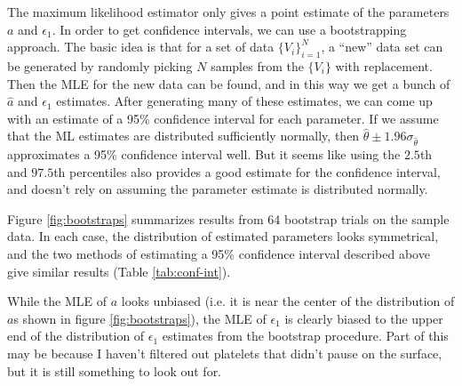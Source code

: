 The maximum likelihood estimator only gives a point estimate of the
parameters $a$ and $\epsilon_1$. In order to get confidence intervals,
we can use a bootstrapping approach. The basic idea is that for a set
of data $\{V_i\}_{i=1}^N$, a ``new'' data set can be generated by
randomly picking $N$ samples from the $\{V_i\}$ with replacement. Then
the MLE for the new data can be found, and in this way we get a bunch
of $\hat{a}$ and $\hat{\epsilon_1}$ estimates. After generating many of
these estimates, we can come up with an estimate of a 95\% confidence
interval for each parameter. If we assume that the ML estimates are
distributed sufficiently normally, then
$\hat{\theta} \pm 1.96 \sigma_{\hat{\theta}}$ approximates a 95\%
confidence interval well. But it seems like using the $2.5$th and
$97.5$th percentiles also provides a good estimate for the confidence
interval, and doesn't rely on assuming the parameter estimate is
distributed normally.

Figure \ref{fig:bootstraps} summarizes results from 64 bootstrap
trials on the sample data. In each case, the distribution of estimated
parameters looks symmetrical, and the two methods of estimating a 95\%
confidence interval described above give similar results (Table
\ref{tab:conf-int}).

While the MLE of $a$ looks unbiased (i.e. it is near the center of the
distribution of $a$s shown in figure \ref{fig:bootstraps}), the MLE of
$\epsilon_1$ is clearly biased to the upper end of the distribution of
$\epsilon_1$ estimates from the bootstrap procedure. Part of this may be
because I haven't filtered out platelets that didn't pause on the
surface, but it is still something to look out for. 



